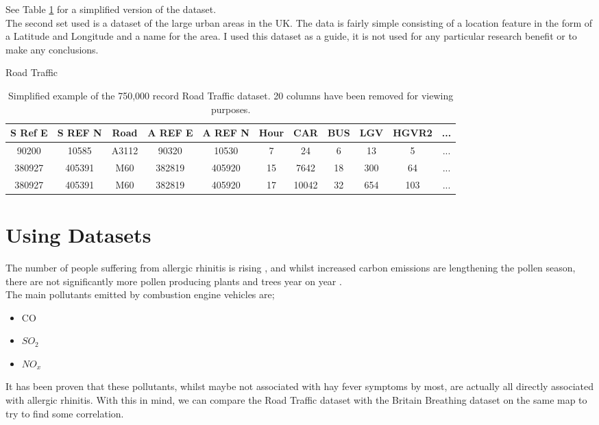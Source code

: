 See Table \ref{RoadTrafficData} for a simplified version of the dataset.\\

The second set used is a dataset of the large urban areas in the UK. The data is fairly simple consisting of a location feature in the form of a Latitude and Longitude and a name for the area. I used this dataset as a guide, it is not used for any particular research benefit or to make any conclusions.\\


\begin{table}
\begin{center}
Road Traffic\\
\begin{tabular}{|c|c|c|c|c|c|c|c|c|c|c|}\hline\hline
S Ref E&S REF N&Road&A REF E&A REF N&Hour&CAR&BUS&LGV&HGVR2&...\\\hline
90200&10585&A3112&90320&10530&7&24&6&13&5&...\\
380927&405391&M60&382819&405920&15&7642&18&300&64&...\\
380927&405391&M60&382819&405920&17&10042&32&654&103&...\\\hline\hline
\end{tabular}

\caption{Simplified example of the 750,000 record Road Traffic dataset. 20 columns have been removed for viewing purposes.}\label{RoadTrafficData}
\end{center}
\end{table}

\section{Using Datasets}

The number of people suffering from allergic rhinitis is rising , and whilst increased carbon emissions are lengthening the pollen season, there are not significantly more pollen producing plants and trees year on year \cite{co2pollen, allergyrising}.\\

The main pollutants emitted by combustion engine vehicles are;\cite{vehcemis}

\begin{itemize}
    \item CO
    \item $SO_2$
    \item $NO_x$
\end{itemize}

It has been proven that these pollutants, whilst maybe not associated with hay fever symptoms by most, are actually all directly associated with allergic rhinitis\cite{airPollution}. With this in mind, we can compare the Road Traffic dataset with the Britain Breathing dataset on the same map to try to find some correlation.\\

